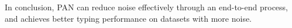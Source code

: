 \documentclass[letterpaper]{article} %
\begin{document}
In conclusion, PAN can reduce noise effectively through an end-to-end process, and achieves better typing performance on datasets with more noise. %





\end{document}
